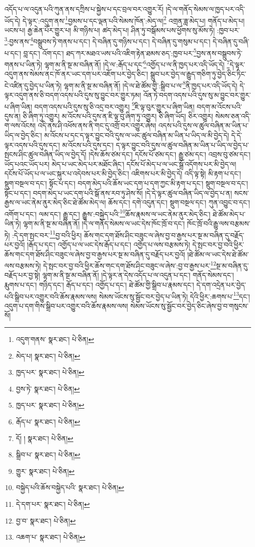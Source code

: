 འདོད་པ་ལ་འདུན་པའི་ཀུན་ནས་དཀྲིས་པ་སྐྱེས་པ་དང་བྲལ་བར་འགྱུར་རོ། །དེ་ལ་གནོད་སེམས་ལ་ཁྱད་པར་འདི་ཡོད་དེ། དེ་ལྟར་:འདུག་ནས་\footnote{འདུག་གནས་  སྣར་ཐང་།  པེ་ཅིན། }བྱམས་པ་དང་ལྡན་པའི་སེམས་ཁོན་:མེད་ལ།\footnote{མེད་པ།  སྣར་ཐང་།  པེ་ཅིན། } འགྲན་ཟླ་མེད་པ། གནོད་པ་མེད་པ། ཡངས་པ། རྒྱ་ཆེན་པོར་གྱུར་པ། མི་གཉིས་པ། ཚད་མེད་པ། ཤིན་ཏུ་བསྒོམས་པས་ཕྱོགས་སུ་མོས་ཏེ། :ཁྱབ་པར་\footnote{ཁྱད་པར་  སྣར་ཐང་།  པེ་ཅིན། }:བྱས་ནས་\footnote{བྱས་ཏེ་  སྣར་ཐང་།  པེ་ཅིན། }བསྒྲུབས་ཏེ་གནས་པ་དང་། དེ་བཞིན་དུ་གཉིས་པ་དང་། དེ་བཞིན་དུ་གསུམ་པ་དང་། དེ་བཞིན་དུ་བཞི་པ་དང་། བླ་དང་། འོག་དང་། ཐད་ཀར་མཐའ་ཡས་པའི་འཇིག་རྟེན་ཐམས་ཅད་:ཁྱབ་པར་\footnote{ཁྱད་པར་  སྣར་ཐང་།  པེ་ཅིན། }བྱས་ནས་བསྒྲུབས་ཏེ་གནས་པ་ཡིན་ཏེ། ལྷག་མ་ནི་སྔ་མ་བཞིན་ནོ། །དེ་ལ་:རྒོད་པ་དང་\footnote{རྒོད་པ་  སྣར་ཐང་།  པེ་ཅིན། }འགྱོད་པ་ལ་ནི་ཁྱད་པར་འདི་ཡོད་དེ། \footnote{དོ། །   སྣར་ཐང་།  པེ་ཅིན། }དེ་ལྟར་འདུག་ནས་སེམས་ནང་ཁོ་ནར་ཡང་དག་པར་འཇོག་པར་བྱེད་ཅིང་། སྒྲུབ་པར་བྱེད་ལ་རྒྱུད་གཅིག་ཏུ་བྱེད་ཅིང་ཏིང་ངེ་འཛིན་དུ་བྱེད་པ་ཡིན་ཏེ། ལྷག་མ་ནི་སྔ་མ་བཞིན་ནོ། །དེ་ལ་ཐེ་ཚོམ་གྱི་:སྒྲིབ་པ་ལ་\footnote{སྒྲིབ་པ་  སྣར་ཐང་།  པེ་ཅིན། }ནི་ཁྱད་པར་འདི་ཡོད་དེ། དེ་ལྟར་འདུག་ནས་ཅི་བདག་འདས་པའི་དུས་སུ་བྱུང་བར་གྱུར་ཏམ། འོན་ཏེ་བདག་འདས་པའི་དུས་སུ་མ་བྱུང་བར་གྱུར་པ་ཞིག་ཡིན། བདག་འདས་པའི་དུས་སུ་ཅི་འདྲ་བར་འགྱུར། \footnote{གྱུར་  སྣར་ཐང་།  པེ་ཅིན། }ཇི་ལྟ་བུར་གྱུར་པ་ཞིག་ཡིན། བདག་མ་འོངས་པའི་དུས་ན། ཅི་ཞིག་ཏུ་འགྱུར། མ་འོངས་པའི་དུས་ན་ཇི་ལྟ་བུ་ཞིག་ཏུ་འགྱུར། ཅི་ཞིག་ཡོད། ཅིར་འགྱུར། སེམས་ཅན་འདི་ག་ལས་འོངས། འདི་ནས་ཤི་འཕོས་ནས་ནི་གང་དུ་འགྲོ་བར་འགྱུར་ཞེས། འདས་པའི་དུས་ལ་ཚུལ་བཞིན་མ་ཡིན་པ་ཡིད་ལ་བྱེད་ཅིང་། མ་འོངས་པ་དང་ད་ལྟར་བྱུང་བའི་དུས་ལ་ཡང་ཚུལ་བཞིན་མ་ཡིན་པ་ཡིད་ལ་མི་བྱེད་དེ། དེ་དེ་ལྟར་འདས་པའི་དུས་དང་། མ་འོངས་པའི་དུས་དང་། ད་ལྟར་བྱུང་བའི་དུས་ལ་ཚུལ་བཞིན་མ་ཡིན་པ་ཡིད་ལ་བྱེད་པ་སྤངས་ཤིང་ཚུལ་བཞིན་ཡིད་ལ་བྱེད་དོ། །དེས་ཆོས་ཙམ་དང་། དངོས་པོ་ཙམ་དང་། རྒྱུ་ཙམ་དང་། འབྲས་བུ་ཙམ་དང་། ཡོད་པའང་ཡོད་པར། མེད་པ་ཡང་མེད་པར་མཐོང་ཞིང་། དངོས་པོ་མེད་པ་ལ་ཡང་སྒྲོ་འདོགས་པར་མི་བྱེད་ལ། དངོས་པོ་ཡོད་པ་ལ་ཡང་སྐུར་པ་འདེབས་པར་མི་བྱེད་ཅིང་། འཇིགས་པར་མི་བྱེད་དེ། འདི་ལྟ་སྟེ། མི་རྟག་པ་དང་། སྡུག་བསྔལ་བ་དང་། སྟོང་པ་དང་། བདག་མེད་པའི་ཆོས་ཡང་དག་པ་དག་ཀྱང་མི་རྟག་པ་དང་། སྡུག་བསྔལ་བ་དང་། སྟོང་པ་དང་། བདག་མེད་པ་ཡང་དག་པའི་སྒོ་ནས་རབ་ཏུ་ཤེས་སོ། །དེ་དེ་ལྟར་ཚུལ་བཞིན་ཡིད་ལ་བྱེད་པ་ན། སངས་རྒྱས་ལ་ཡང་ནེམ་ནུར་མེད་ཅིང་ཐེ་ཚོམ་མེད་ལ། ཆོས་དང་། དགེ་འདུན་དང་། སྡུག་བསྔལ་དང་། ཀུན་འབྱུང་བ་དང་། འགོག་པ་དང་། ལམ་དང་། རྒྱུ་དང་། རྒྱུས་:བསྐྱེད་པའི་\footnote{བསྐྱེད་པའི་ཆོས་བསྐྱེད་པའི་  སྣར་ཐང་།  པེ་ཅིན། }ཆོས་རྣམས་ལ་ཡང་ནེམ་ནུར་མེད་ཅིང་། ཐེ་ཚོམ་མེད་པ་ཡིན་ཏེ། ལྷག་མ་ནི་སྔ་མ་བཞིན་ནོ། །དེ་ལ་གནོད་སེམས་ལ་ཡང་དེས་ཁོང་ཁྲོ་བ་དང་། ཁོང་ཁྲོ་བའི་རྒྱུ་ལས་བརྩམས་ཏེ། :དེ་དག་སྤང་བར་\footnote{དེ་དག་པར་  སྣར་ཐང་།  པེ་ཅིན། }བྱ་བའི་ཕྱིར། ཆོས་གང་དག་ཐོས་ཤིང་བཟུང་ལ་ཞེས་བྱ་བ་རྒྱས་པར་སྔ་མ་བཞིན་དུ་བརྗོད་པར་བྱའོ། །རྒོད་པ་དང་། འགྱོད་པ་ལ་ཡང་དེས་རྒོད་པ་དང་། འགྱོད་པ་ལས་བརྩམས་ཏེ། དེ་སྤང་བར་བྱ་བའི་ཕྱིར་ཆོས་གང་དག་ཐོས་ཤིང་བཟུང་ལ་ཞེས་བྱ་བ་རྒྱས་པར་སྔ་མ་བཞིན་དུ་བརྗོད་པར་བྱའོ། །ཐེ་ཚོམ་ལ་ཡང་དེས་ཐེ་ཚོམ་ལས་བརྩམས་ཏེ། དེ་སྤང་བར་བྱ་བའི་ཕྱིར་ཆོས་གང་དག་ཐོས་ཤིང་བཟུང་ལ་ཞེས་:བྱ་བ་རྒྱས་པར་\footnote{བྱ་བ་  སྣར་ཐང་།  པེ་ཅིན། }སྔ་མ་བཞིན་དུ་བརྗོད་པར་བྱ་སྟེ། ལྷག་མ་ནི་སྔ་མ་བཞིན་ནོ། །དེ་ལྟར་ན་དེས་འདོད་པ་ལ་འདུན་པ་དང་། གནོད་སེམས་དང་། རྨུགས་པ་དང་། གཉིད་དང་། རྒོད་པ་དང་། འགྱོད་པ་དང་། ཐེ་ཚོམ་གྱི་སྒྲིབ་པ་རྣམས་དང་། དེ་དག་འདྲེན་པར་བྱེད་པའི་སྒྲིབ་པར་འགྱུར་བའི་ཆོས་རྣམས་ལས། སེམས་ཡོངས་སུ་སྦྱོང་བར་བྱེད་པ་ཡིན་ཏེ། དེའི་ཕྱིར་:ཆགས་པ་\footnote{འཆག་པ་  སྣར་ཐང་།  པེ་ཅིན། }དང་། འདུག་པ་དག་གིས་སྒྲིབ་པར་འགྱུར་བའི་ཆོས་རྣམས་ལས། སེམས་ཡོངས་སུ་སྦྱོང་བར་བྱེད་ཅིང་ཞེས་བྱ་བ་གསུངས་སོ། 